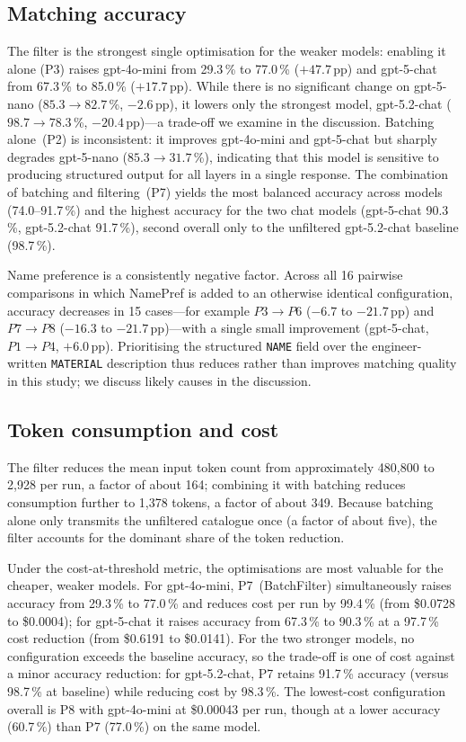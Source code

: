 \documentclass[10pt, a4paper, twocolumn]{article}
\begin{document}
\subsection{Matching accuracy}

The filter is the strongest single optimisation for the weaker models: enabling it alone (P3) raises gpt-4o-mini from 29.3\,\% to 77.0\,\% ($+47.7$\,pp) and gpt-5-chat from 67.3\,\% to 85.0\,\% ($+17.7$\,pp). While there is no significant change on gpt-5-nano ($85.3\rightarrow82.7$\,\%, $-2.6$\,pp), it lowers only the strongest model, gpt-5.2-chat ($98.7\rightarrow78.3$\,\%, $-20.4$\,pp)---a trade-off we examine in the discussion. Batching alone~(P2)
is inconsistent: it improves gpt-4o-mini and gpt-5-chat but sharply degrades gpt-5-nano
($85.3\rightarrow31.7$\,\%), indicating that this model is sensitive to producing
structured output for all layers in a single response. The combination of batching and
filtering~(P7) yields the most balanced accuracy across models (74.0--91.7\,\%) and the
highest accuracy for the two chat models (gpt-5-chat 90.3\,\%, gpt-5.2-chat 91.7\,\%),
second overall only to the unfiltered gpt-5.2-chat baseline (98.7\,\%).

Name preference is a consistently negative factor. Across all 16 pairwise
comparisons in which NamePref is added to an otherwise identical configuration, accuracy
decreases in 15 cases---for example $P3\rightarrow P6$ ($-6.7$ to $-21.7$\,pp) and
$P7\rightarrow P8$ ($-16.3$ to $-21.7$\,pp)---with a single small improvement
(gpt-5-chat, $P1\rightarrow P4$, $+6.0$\,pp). Prioritising the structured \texttt{NAME}
field over the engineer-written \texttt{MATERIAL} description thus reduces rather than
improves matching quality in this study; we discuss likely causes in
the discussion. 

\subsection{Token consumption and cost}

The filter reduces the mean input token count from approximately 480{,}800 to 2{,}928
per run, a factor of about 164; combining it with batching reduces consumption further
to 1{,}378 tokens, a factor of about 349. Because batching alone only transmits the
unfiltered catalogue once (a factor of about five), the filter accounts for the dominant
share of the token reduction.

Under the cost-at-threshold metric, the optimisations are most valuable for the cheaper,
weaker models. For gpt-4o-mini, P7~(BatchFilter) simultaneously raises accuracy from
29.3\,\% to 77.0\,\% and reduces cost per run by 99.4\,\% (from \$0.0728 to \$0.0004);
for gpt-5-chat it raises accuracy from 67.3\,\% to 90.3\,\% at a 97.7\,\% cost reduction
(from \$0.6191 to \$0.0141). For the two stronger models, no configuration exceeds the
baseline accuracy, so the trade-off is one of cost against a minor accuracy reduction:
for gpt-5.2-chat, P7 retains 91.7\,\% accuracy (versus 98.7\,\% at baseline) while
reducing cost by 98.3\,\%. The lowest-cost configuration overall is P8 with gpt-4o-mini
at \$0.00043 per run, though at a lower accuracy (60.7\,\%) than P7 (77.0\,\%) on the
same model.
\end{document}
